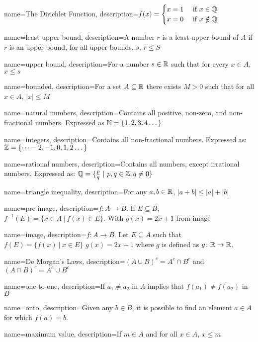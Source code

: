 \usepackage[toc, hyperfirst]{glossaries}

\makeglossaries

{
name=The Dirichlet Function,
description={$f(x)=
\begin{cases}
    x = 1 &\text{ if } x \in \mathbb{Q} \\
    x = 0 &\text{ if } x \notin \mathbb{Q}
\end{cases}$}
}

{   
    name=least upper bound,
    description={A number $r$ is a least upper bound of $A$ if $r$ is an upper bound, for all upper bounds, $s$, $r \leq S$}
}

{
    name=upper bound,
    description={For a number $s \in \mathbb{R}$ such that for every $x \in A$, $x \leq s$}
}

{
    name=bounded,
    description={For a set $A \subseteq \mathbb{R}$ there exists $M > 0$ such that for all $x \in A$, $|x| \leq M$}
}

{
    name=natural numbers,
    description={Contains all positive, non-zero, and non-fractional numbers. Expressed as $\mathbb{N} = \{1,2,3,4\dots\}$}
}

{
    name=integers,
    description={Contains all non-fractional numbers. Expressed as: $\mathbb{Z} = \{\dots-2,-1,0,1,2\dots\}$}
}

{
    name=rational numbers,
    description={Contains all numbers, except irrational numbers. Expressed as: $\mathbb{Q} = \{\frac{p}{q} \ | \ p,q \in \mathbb{Z}, q \ne 0\}$}
}

{
    name=triangle inequality,
    description={For any $a,b \in \mathbb{R}$, $|a + b| \leq  |a| + |b|$}
}

{
    name=pre-image,
    description={$f \colon A \rightarrow B$. If $E \subseteq B$, $f^{-1}(E) = \{x\in A \ | \ f(x) \in E\}$. With $g(x) = 2x + 1$ from image}
}

{
    name=image,
    description={$f\colon A \rightarrow B$. Let $E \subseteq A$ such that $f(E) = \{f(x) \ | \ x \in E\}$ $g(x) = 2x + 1$ where $g$ is defined as $g \colon \mathbb{R} \rightarrow \mathbb{R}$.}
}

{
    name=De Morgan's Laws,
    description={$(A \cup B)^c = A^c \cap B^c$ and $(A \cap B)^c = A^c \cup B^c$}
}

{
    name=one-to-one,
    description={If $a_1 \ne a_2$ in $A$ implies that $f(a_1) \ne f(a_2)$ in $B$}
}

{
    name=onto,
    description={Given any $b\in B$, it is possible to find an element $a \in A$ for which $f(a) = b$.}
}

{
    name=maximum value,
    description={If $m \in A$ and for all $x\in A$, $x \leq m$}
}
